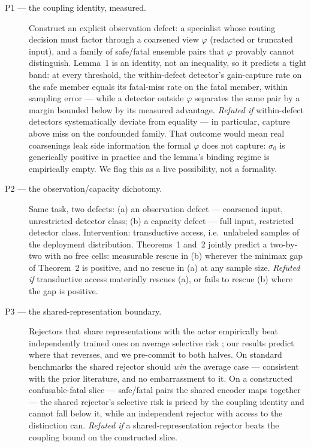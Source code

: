 \begin{description}
\item[P1 --- the coupling identity, measured.] Construct an explicit
  observation defect: a specialist whose routing decision must factor
  through a coarsened view $\varphi$ (redacted or truncated input), and a
  family of safe/fatal ensemble pairs that $\varphi$ provably cannot
  distinguish. Lemma~1 is an identity, not an inequality, so it predicts a
  tight band: at every threshold, the within-defect detector's gain-capture
  rate on the safe member equals its fatal-miss rate on the fatal member,
  within sampling error --- while a detector outside $\varphi$ separates the
  same pair by a margin bounded below by its measured advantage.
  \emph{Refuted if} within-defect detectors systematically deviate from
  equality --- in particular, capture above miss on the confounded family.
  That outcome would mean real coarsenings leak side information the formal
  $\varphi$ does not capture: $\sigma_0$ is generically positive in practice
  and the lemma's binding regime is empirically empty. We flag this as a
  live possibility, not a formality.

\item[P2 --- the observation/capacity dichotomy.] Same task, two defects:
  (a) an observation defect --- coarsened input, unrestricted detector
  class; (b) a capacity defect --- full input, restricted detector class.
  Intervention: transductive access, i.e.\ unlabeled samples of the
  deployment distribution. Theorems~1 and~2 jointly predict a two-by-two
  with no free cells: measurable rescue in (b) wherever the minimax gap of
  Theorem~2 is positive, and no rescue in (a) at any sample size.
  \emph{Refuted if} transductive access materially rescues (a), or fails to
  rescue (b) where the gap is positive.

\item[P3 --- the shared-representation boundary.] Rejectors that share
  representations with the actor empirically beat independently trained
  ones on average selective risk \citep{geifman2019selectivenet}; our
  results predict where that reverses, and we pre-commit to both halves.
  On standard benchmarks the shared rejector should \emph{win} the average
  case --- consistent with the prior literature, and no embarrassment to
  it. On a constructed confusable-fatal slice --- safe/fatal pairs the
  shared encoder maps together --- the shared rejector's selective risk is
  priced by the coupling identity and cannot fall below it, while an
  independent rejector with access to the distinction can. \emph{Refuted
  if} a shared-representation rejector beats the coupling bound on the
  constructed slice.


\end{description}
